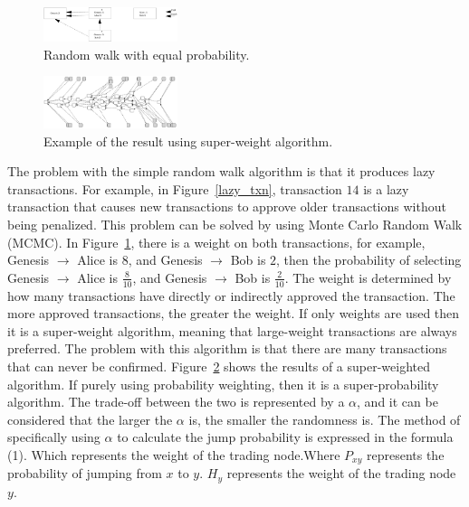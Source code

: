\begin{figure}[!ht]
\begin{center}
\includegraphics[width=0.35\textwidth]{figures/random_unequal.eps}
    \caption{
        Random walk with equal probability.
     }
\label{random_unequal}
\end{center}
\end{figure}

\begin{figure}[!ht]
\begin{center}
\includegraphics[width=0.35\textwidth]{figures/super_weight.png}
    \caption{
        Example of the result using super-weight algorithm.
     }
\label{super_weight}
\end{center}
\end{figure}

The problem with the simple random walk algorithm is that it produces lazy transactions.
For example, in Figure~\ref{lazy_txn}, transaction $14$ is a lazy transaction that causes new transactions to approve older transactions without being penalized.
This problem can be solved by using Monte Carlo Random Walk (MCMC).
In Figure~\ref{random_unequal}, there is a weight on both transactions, for example, Genesis $\rightarrow$ Alice is $8$, and Genesis $\rightarrow$ Bob is $2$,
then the probability of selecting Genesis $\rightarrow$ Alice is $\frac{8}{10}$,
and Genesis $\rightarrow$ Bob is $\frac{2}{10}$. 
The weight is determined by how many transactions have directly or indirectly approved the transaction.
The more approved transactions, the greater the weight.
If only weights are used then it is a super-weight algorithm, meaning that large-weight transactions are always preferred.
The problem with this algorithm is that there are many transactions that can never be confirmed.
Figure~\ref{super_weight} shows the results of a super-weighted algorithm. 
If purely using probability weighting, then it is a
super-probability algorithm. The trade-off between the two is represented by a $\alpha$, and it can be considered that the
larger the $\alpha$ is, the smaller the randomness is.
The method of specifically using $\alpha$ to calculate the jump probability is expressed in the formula (1).
Which represents the weight of the trading node.Where $P_{xy}$ represents the probability of jumping from $x$ to $y$. $H_{y}$ represents the weight of the trading node $y$.

